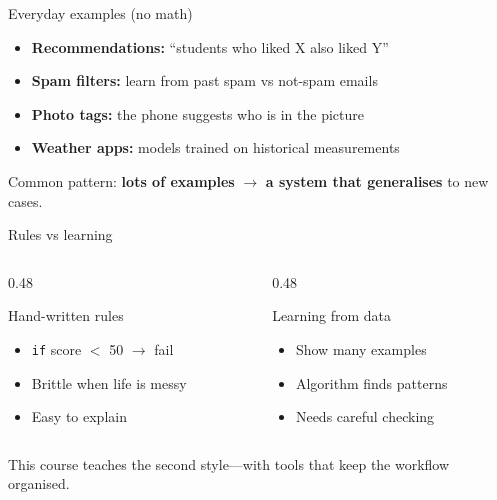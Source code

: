 \documentclass[aspectratio=169,11pt]{beamer}
\begin{document}
    \begin{frame}{Everyday examples (no math)}
        \begin{itemize}
            \item \textbf{Recommendations:} ``students who liked X also liked Y''
            \item \textbf{Spam filters:} learn from past spam vs not-spam emails
            \item \textbf{Photo tags:} the phone suggests who is in the picture
            \item \textbf{Weather apps:} models trained on historical measurements
        \end{itemize}
        \vspace{0.5em}
        Common pattern: \textbf{lots of examples} $\rightarrow$ \textbf{a system that generalises} to new cases.
    \end{frame}

    \begin{frame}{Rules vs learning}
        \begin{columns}[T]
            \begin{column}{0.48\textwidth}
                \begin{block}{Hand-written rules}
                    \begin{itemize}
                        \item \texttt{if} score $<$ 50 $\rightarrow$ fail
                        \item Brittle when life is messy
                        \item Easy to explain
                    \end{itemize}
                \end{block}
            \end{column}
            \begin{column}{0.48\textwidth}
                \begin{block}{Learning from data}
                    \begin{itemize}
                        \item Show many examples
                        \item Algorithm finds patterns
                        \item Needs careful checking
                    \end{itemize}
                \end{block}
            \end{column}
        \end{columns}
        \vspace{0.5em}
        This course teaches the second style---with tools that keep the workflow organised.
    \end{frame}
\end{document}
